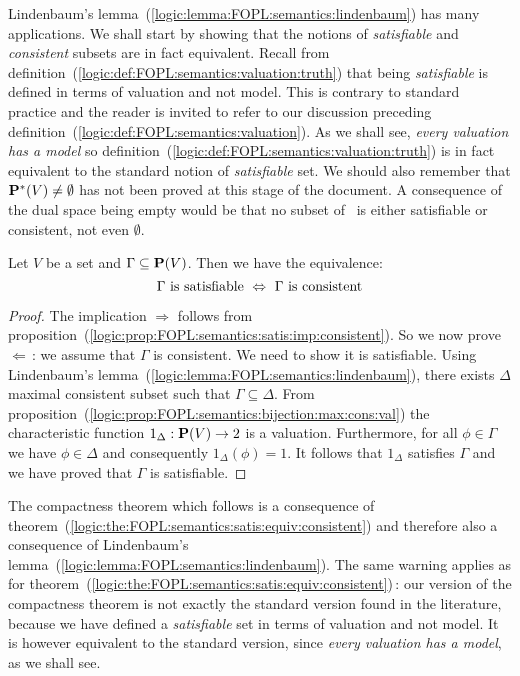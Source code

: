 Lindenbaum's lemma~(\ref{logic:lemma:FOPL:semantics:lindenbaum}) has
many applications. We shall start by showing that the notions of
{\em satisfiable} and {\em consistent} subsets are in fact
equivalent. Recall from
definition~(\ref{logic:def:FOPL:semantics:valuation:truth}) that
being {\em satisfiable} is defined in terms of valuation and not
model. This is contrary to standard practice and the reader is
invited to refer to our discussion preceding
definition~(\ref{logic:def:FOPL:semantics:valuation}). As we shall
see, {\em every valuation has a model} so
definition~(\ref{logic:def:FOPL:semantics:valuation:truth}) is in
fact equivalent to the standard notion of {\em satisfiable} set. We
should also remember that $\mbox{${\bf P}^{*}(V)$}\neq\emptyset$ has not been proved at
this stage of the document. A consequence of the dual space being
empty would be that no subset of \pv\ is either satisfiable or
consistent, not even $\emptyset$.

\begin{theorem}\label{logic:the:FOPL:semantics:satis:equiv:consistent}
Let $V$ be a set and $\Gamma\subseteq\mbox{${\bf P}(V)$}$. Then we have the
equivalence:
    \[
    \Gamma\mbox{\ is satisfiable}\ \Leftrightarrow\ \Gamma\mbox{\
    is consistent}
    \]
\end{theorem}
\begin{proof}
The implication $\Rightarrow$ follows from
proposition~(\ref{logic:prop:FOPL:semantics:satis:imp:consistent}).
So we now prove $\Leftarrow$\,: we assume that $\Gamma$ is
consistent. We need to show it is satisfiable. Using Lindenbaum's
lemma~(\ref{logic:lemma:FOPL:semantics:lindenbaum}), there exists
$\Delta$ maximal consistent subset such that
$\Gamma\subseteq\Delta$. From
proposition~(\ref{logic:prop:FOPL:semantics:bijection:max:cons:val})
the characteristic function $1_{\Delta}:\mbox{${\bf P}(V)$}\to 2$ is a valuation.
Furthermore, for all $\phi\in\Gamma$ we have $\phi\in\Delta$ and
consequently $1_{\Delta}(\phi)=1$. It follows that $1_{\Delta}$
satisfies $\Gamma$ and we have proved that $\Gamma$ is satisfiable.
\end{proof}

The compactness theorem which follows is a consequence of
theorem~(\ref{logic:the:FOPL:semantics:satis:equiv:consistent}) and
therefore also a consequence of Lindenbaum's
lemma~(\ref{logic:lemma:FOPL:semantics:lindenbaum}). The same
warning applies as for
theorem~(\ref{logic:the:FOPL:semantics:satis:equiv:consistent})\,:
our version of the compactness theorem is not exactly the standard
version found in the literature, because we have defined a {\em
satisfiable} set in terms of valuation and not model. It is however
equivalent to the standard version, since {\em every valuation has a
model}, as we shall see.

